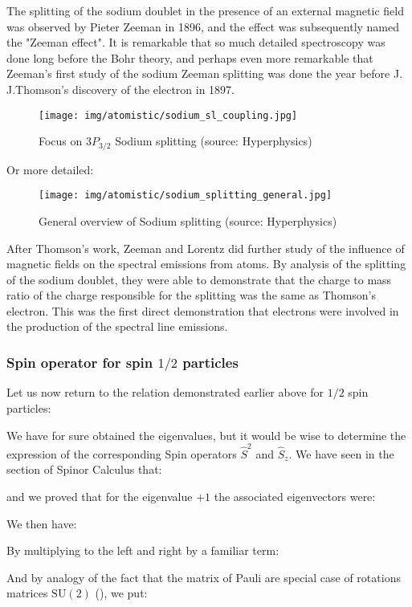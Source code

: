 	The splitting of the sodium doublet in the presence of an external magnetic field was observed by Pieter Zeeman in 1896, and the effect was subsequently named the "Zeeman effect". It is remarkable that so much detailed spectroscopy was done long before the Bohr theory, and perhaps even more remarkable that Zeeman's first study of the sodium Zeeman splitting was done the year before J. J.Thomson's discovery of the electron in 1897.
	\begin{figure}[H]
		\centering
		\texttt{[image: img/atomistic/sodium\_sl\_coupling.jpg]}
		\caption[]{Focus on $3P_{3/2}$ Sodium splitting (source: Hyperphysics)}
	\end{figure}
	Or more detailed:
	\begin{figure}[H]
		\centering
		\texttt{[image: img/atomistic/sodium\_splitting\_general.jpg]}
		\caption[General overview of Sodium splitting]{General overview of Sodium splitting (source: Hyperphysics)}
	\end{figure}
	After Thomson's work, Zeeman and Lorentz did further study of the influence of magnetic fields on the spectral emissions from atoms. By analysis of the splitting of the sodium doublet, they were able to demonstrate that the charge to mass ratio of the charge responsible for the splitting was the same as Thomson's electron. This was the first direct demonstration that electrons were involved in the production of the spectral line emissions.
	
	\subsubsection{Spin operator for spin $1/2$ particles}
	Let us now return to the relation demonstrated earlier above for $1/2$ spin particles:
	
	We have for sure obtained the eigenvalues, but it would be wise to determine the expression of the corresponding Spin operators $\hat{S}^2$ and $\hat{S}_z$. We have seen in the section of Spinor Calculus that:
	
	and we proved that for the eigenvalue $+1$ the associated eigenvectors were:
	
	We then have:
	
	By multiplying to the left and right by a familiar term:
	
	And by analogy of the fact that the matrix of Pauli are special case of rotations matrices $\text{SU}(2)$ (), we put:
	
